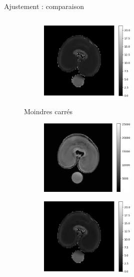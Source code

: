 \documentclass[10pt]{beamer}
\begin{document}
\begin{frame}{Ajustement : comparaison}
\begin{columns}
\begin{column}[c]{0.8\textwidth}
\begin{figure}[ht]
\begin{subfigure}[t]{0.5\textwidth}
    \end{subfigure}%
    \begin{subfigure}[t]{0.5\textwidth}
      \centering
      \includegraphics[width=0.5\textwidth]{fig/linear_regression_new_t2}
    \end{subfigure}
    \begin{flushleft}
      Moindres carrés
      \vspace{-0.25cm}
    \end{flushleft}
    \begin{subfigure}[t]{0.5\textwidth}
      \centering
      \includegraphics[width=0.5\textwidth]{fig/nnls}
    \end{subfigure}%
    \begin{subfigure}[t]{0.5\textwidth}
      \centering
      \includegraphics[width=0.5\textwidth]{fig/nnls_t2}
    \end{subfigure}%
      \end{figure}

    \end{column}
  \end{columns}
  


\end{frame}
\end{document}
